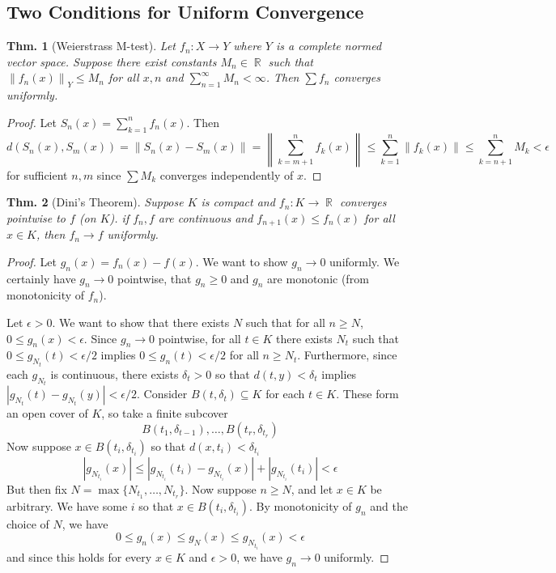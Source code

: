 \documentclass[12pt, a4paper]{book}
\DeclareMathOperator{\R}{\mathbb{R}}
\newcommand{\norm}[1]{\left\lVert#1\right\rVert} %
\newtheorem{theorem}{Thm.}[section]
\theoremstyle{nonumberplain}
\newtheorem{proof}{Proof}
\begin{document}
\subsection{Two Conditions for Uniform Convergence}
\begin{theorem}[Weierstrass M-test]
    Let $f_n:X\to Y$ where $Y$ is a complete normed vector space. Suppose there exist constants $M_n\in\R$ such that
    $\norm{f_n(x)}_Y\leq M_n$ for all $x,n$ and $\sum\limits_{n=1}^\infty M_n<\infty$. Then $\sum f_n$ converges
    uniformly.
\end{theorem}
\begin{proof}
    Let $S_n(x)=\sum\limits_{k=1}^n f_n(x)$. Then
    \[d(S_n(x),S_m(x))=\norm{S_n(x)-S_m(x)}=\norm{\sum\limits_{k=m+1}^n f_k(x)}\leq\sum\limits_{k=1}^n\norm{f_k(x)}\leq\sum\limits_{k=n+1}^n M_k<\epsilon\]
    for sufficient $n,m$ since $\sum M_k$ converges independently of $x$.
\end{proof}
\begin{theorem}[Dini's Theorem]
    Suppose $K$ is compact and $f_n:K\to\R$ converges pointwise to $f$ (on $K$). if $f_n,f$ are continuous and $f_{n+1}(x)\leq f_n(x)$
    for all $x\in K$, then $f_n\to f$ uniformly.
\end{theorem}
\begin{proof}
    Let $g_n(x)=f_n(x)-f(x)$.
    We want to show $g_n\to 0$ uniformly.
    We certainly have $g_n\to 0$ pointwise, that $g_n\geq 0$ and $g_n$ are monotonic (from monotonicity of $f_n$).

    Let $\epsilon>0$.
    We want to show that there exists $N$ such that for all $n\geq N$, $0\leq g_n(x)<\epsilon$.
    Since $g_n\to 0$ pointwise, for all $t\in K$ there exists $N_t$ such that $0\leq g_{N_t}(t)<\epsilon/2$ implies $0\leq g_n(t)<\epsilon/2$ for all $n\geq N_t$.
    Furthermore, since each $g_{N_t}$ is continuous, there exists $\delta_t>0$ so that $d(t,y)<\delta_t$ implies $|g_{N_t}(t)-g_{N_t}(y)|<\epsilon/2$.
    Consider $B(t,\delta_t)\subseteq K$ for each $t\in K$.
    These form an open cover of $K$, so take a finite subcover
    \[B(t_1,\delta_{t-1}),\ldots,B(t_r,\delta_{t_r})\]
    Now suppose $x\in B(t_i,\delta_{t_i})$ so that $d(x,t_i)<\delta_{t_i}$
    \[|g_{N_{t_i}}(x)|\leq |g_{N_{t_i}}(t_i)-g_{N_{t_i}}(x)|+|g_{N_{t_i}}(t_i)|<\epsilon\]
    But then fix $N=\max\{N_{t_1},\ldots,N_{t_r}\}$.
    Now suppose $n\geq N$, and let $x\in K$ be arbitrary.
    We have some $i$ so that $x\in B(t_i,\delta_{t_i})$.
    By monotonicity of $g_n$ and the choice of $N$, we have
    \[0\leq g_n(x)\leq g_N(x)\leq g_{N_{t_i}}(x)<\epsilon\]
    and since this holds for every $x\in K$ and $\epsilon>0$, we have $g_n\to 0$ uniformly.
\end{proof}
\end{document}
